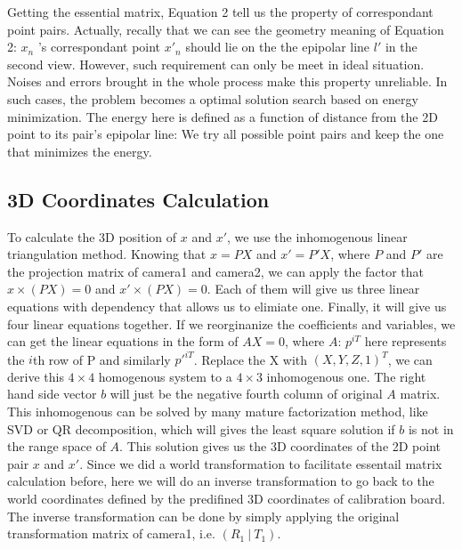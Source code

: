 \documentclass[10pt,twocolumn,letterpaper]{article}
\begin{document}
Getting the essential matrix, Equation 2 tell us the property of correspondant point pairs. Actually, recally that \endequation we can see the geometry meaning of Equation 2: $x_{n}$ 's correspondant point $x'_{n}$ should lie on the the epipolar line $l'$ in the second view. 
However, such requirement can only be meet in ideal situation. Noises and errors brought in the whole process make this property unreliable. In such cases, the problem becomes a optimal solution search based on energy minimization. The energy here is defined as a function of distance from the 2D point to its pair's epipolar line:   \endequation We try all possible point pairs and keep the one that minimizes the energy.

\subsection{3D Coordinates Calculation}
To calculate the 3D position of $x$ and $x'$, we use the inhomogenous linear triangulation method\cite{multipleview}. Knowing that $x = PX$ and $x' = P'X$, where $P$ and $P'$ are the projection matrix of camera1 and camera2, we can apply the factor that $x\times(PX) = 0$ and $x'\times(PX) = 0$. Each of them will give us three linear equations with dependency that allows us to elimiate one. Finally, it will give us four linear equations together. If we reorginanize the coefficients and variables, we can get the linear equations in the form of $AX = 0$, where $A$:
\endequation
$p^{iT}$ here represents the $i$th row of P and similarly $p'^{iT}$. Replace the X with $(X,Y,Z,1)^{T}$, we can derive this $4\times4$ homogenous system to a $4\times3$ inhomogenous one. The right hand side vector $b$ will just be the negative fourth column of original $A$ matrix. This inhomogenous can be solved by many mature factorization method, like SVD or QR decomposition, which will gives the least square solution if $b$ is not in the range space of $A$. This solution gives us the 3D coordinates of the 2D point pair $x$ and $x'$. Since we did a world transformation to facilitate essentail matrix calculation before, here we will do an inverse transformation to go back to the world coordinates defined by the predifined 3D coordinates of calibration board. The inverse transformation can be done by simply applying the original transformation matrix of camera1, i.e. $(R_{1}~|~T_{1})$.
\end{document}
